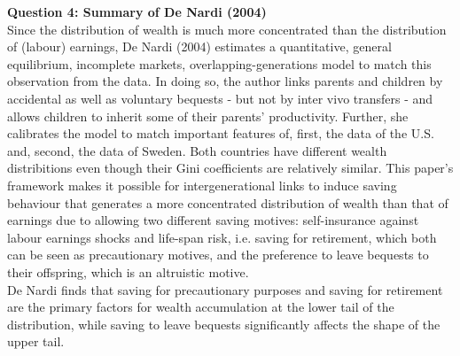 \documentclass[a4paper,12pt, parskip=half-]{scrartcl}
\begin{document}
\textbf{Question 4: Summary of De Nardi (2004)}\\

Since the distribution of wealth is much more concentrated than the distribution of (labour) earnings, De Nardi (2004) estimates a quantitative, general equilibrium, incomplete markets, overlapping-generations model to match this observation from the data. In doing so, the author links parents and children by accidental as well as voluntary bequests - but not by inter vivo transfers - and allows children to inherit some of their parents' productivity. Further, she calibrates the model to match important features of, first, the data of the U.S. and, second, the data of Sweden. Both countries have different wealth distribitions even though their Gini coefficients are relatively similar. This paper's framework makes it possible for intergenerational links to induce saving behaviour that generates a more concentrated distribution of wealth than that of earnings due to allowing two different saving motives: self-insurance against labour earnings shocks and life-span risk, i.e. saving for retirement, which both can be seen as precautionary motives, and the preference to leave bequests to their offspring, which is an altruistic motive. 
\\
De Nardi finds that saving for precautionary purposes and saving for retirement are the primary factors for wealth accumulation at the lower tail of the distribution, while saving to leave bequests significantly affects the shape of the upper tail.
\end{document}
